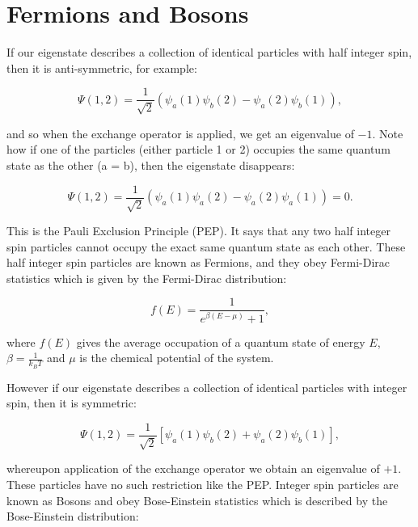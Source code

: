 \section{Fermions and Bosons}

If our eigenstate describes a collection of identical particles with half integer spin, then it is anti-symmetric, for example:

\begin{equation}
    \Psi (1, 2) = \frac{1}{\sqrt{2}} (\psi_a(1) \psi_b (2) - \psi_a (2) \psi_b (1)),
    \label{AntiSymmetricEigenfunction}
\end{equation}

\noindent and so when the exchange operator is applied, we get an eigenvalue of $-1$. Note how if one of the particles (either particle  1 or 2) occupies the same quantum state as the other (a = b), then the eigenstate disappears:

\begin{equation}
    \Psi (1, 2) = \frac{1}{\sqrt{2}} (\psi_a(1) \psi_a (2) - \psi_a (2) \psi_a (1)) = 0.
\end{equation}

\noindent This is the Pauli Exclusion Principle (PEP). It says that any two half integer spin particles cannot occupy the exact same quantum state as each other. These half integer spin particles are known as Fermions, and they obey Fermi-Dirac statistics which is given by the Fermi-Dirac distribution:

\begin{equation}
    \boxed{f(E) = \frac{1}{e^{\beta (E - \mu)} + 1}},
    \label{FermiDiracDistributionFunction}
\end{equation}

\noindent where $f(E)$ gives the average occupation of a quantum state of energy $E$, $\beta = \frac{1}{k_B T}$ and $\mu$ is the chemical potential of the system.

\noindent However if our eigenstate describes a collection of identical particles with integer spin, then it is symmetric:

\begin{equation}
    \Psi (1, 2) = \frac{1}{\sqrt{2}} [\psi_a(1) \psi_b (2) + \psi_a (2) \psi_b (1)],
    \label{SymmetricEigenfunction}
\end{equation}

\noindent whereupon application of the exchange operator we obtain an eigenvalue of $+1$. These particles have no such restriction like the PEP. Integer spin particles are known as Bosons and obey Bose-Einstein statistics which is described by the Bose-Einstein distribution:

